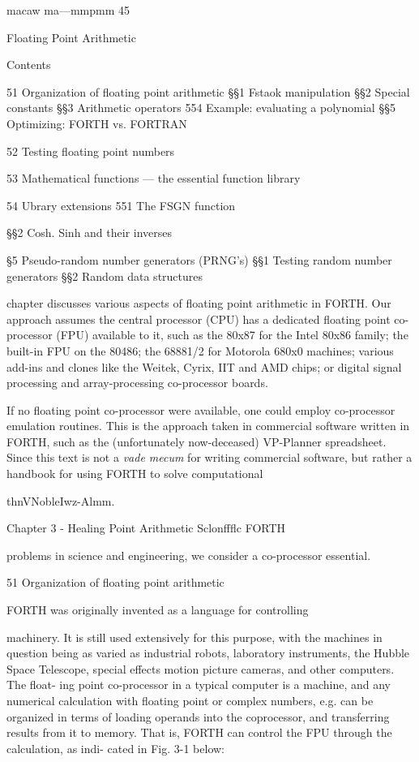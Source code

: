 macaw ma—mmpmm 45

Floating Point Arithmetic

Contents

51 Organization of floating point arithmetic
§§1 Fstaok manipulation
§§2 Special constants
§§3 Arithmetic operators
554 Example: evaluating a polynomial
§§5 Optimizing: FORTH vs. FORTRAN

52 Testing floating point numbers

53 Mathematical functions — the essential function library

54 Ubrary extensions
551 The FSGN function

§§2 Cosh. Sinh and their inverses

§5 Pseudo-random number generators (PRNG's)
§§1 Testing random number generators
§§2 Random data structures
\iffalse
9$$Eﬂiﬂ88388$3$$
\fi

 chapter discusses various aspects of floating point arithmetic in
FORTH. Our approach assumes the central processor (CPU) has a dedicated floating
point co-processor (FPU)
available to it, such as the 80x87 for the Intel 80x86 family; the
built-in FPU on the 80486; the 68881/2 for Motorola 680x0
machines; various add-ins and clones like the Weitek, Cyrix, IIT
and AMD chips; or digital signal processing and array-processing
co-processor boards.

If no floating point co-processor were available, one could
employ co-processor emulation routines. This is the approach
taken in commercial software written in FORTH, such as the
(unfortunately now-deceased) VP-Planner spreadsheet. Since
this text is not a \textit{vade mecum} for writing commercial software, but
rather a handbook for using FORTH to solve computational

thnVNobleIwz-Almm.

Chapter 3 - Healing Point Arithmetic Sclonffﬂc FORTH

problems in science and engineering, we consider a co-processor
essential.

51 Organization of floating point arithmetic

FORTH was originally invented as a language for controlling

machinery. It is still used extensively for this purpose, with the
machines in question being as varied as industrial robots,
laboratory instruments, the Hubble Space Telescope, special
effects motion picture cameras, and other computers. The ﬂoat-
ing point co-processor in a typical computer is a machine, and any
numerical calculation with floating point or complex numbers,
e.g. can be organized in terms of loading operands into the
coprocessor, and transferring results from it to memory. That is,
FORTH can control the FPU through the calculation, as indi-
cated in Fig. 3-1 below:

